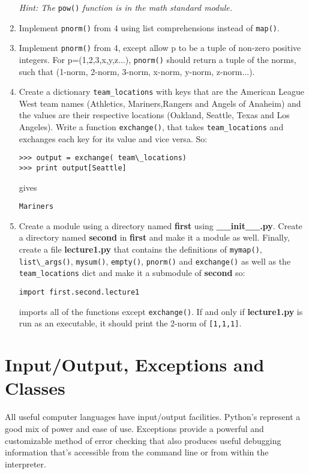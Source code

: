 \begin{enumerate}
\emph{Hint: The }\verb|pow()| \emph{function is in the math standard module.}

	\item Implement \verb|pnorm()| from 4 using list comprehensions instead of \verb|map()|.

	\item Implement \verb|pnorm()| from 4, except allow p to be a tuple of non-zero positive integers. For p=(1,2,3,x,y,z...), \verb|pnorm()| should return a tuple of the norms, such that (1-norm, 2-norm, 3-norm, x-norm, y-norm, z-norm...).

	\item Create a dictionary \verb|team_locations| with keys that are the American League West team names (Athletics, Mariners,Rangers and Angels of Anaheim) and the values are their respective locations (Oakland, Seattle, Texas and Los Angeles). Write a function \verb|exchange()|, that takes \verb|team_locations| and exchanges each key for its value and vice versa. So:

\begin{verbatim}
>>> output = exchange( team\_locations)
>>> print output[Seattle]
\end{verbatim}
gives

\verb|Mariners|
	

	\item Create a module using a directory named \textbf{first} using \textbf{\_\_init\_\_.py}. Create a directory named \textbf{second} in \textbf{first} and make it a module as well. Finally, create a file \textbf{lecture1.py} that contains the definitions of \verb|mymap()|, \verb|list\_args()|, \verb|mysum()|, \verb|empty()|, \verb|pnorm()| and \verb|exchange()| as well as the \verb|team_locations| dict and make it a submodule of \textbf{second} so:

\verb|import first.second.lecture1|

imports all of the functions except \verb|exchange()|. If and only if \textbf{lecture1.py} is run as an executable, it should print the 2-norm of \verb|[1,1,1]|.

\end{enumerate}

\section{Input/Output, Exceptions and Classes}
All useful computer languages have input/output facilities. Python's represent a good mix of power and ease of use. Exceptions provide a powerful and customizable method of error checking that also produces useful debugging information that's accessible from the command line or from within the interpreter.

